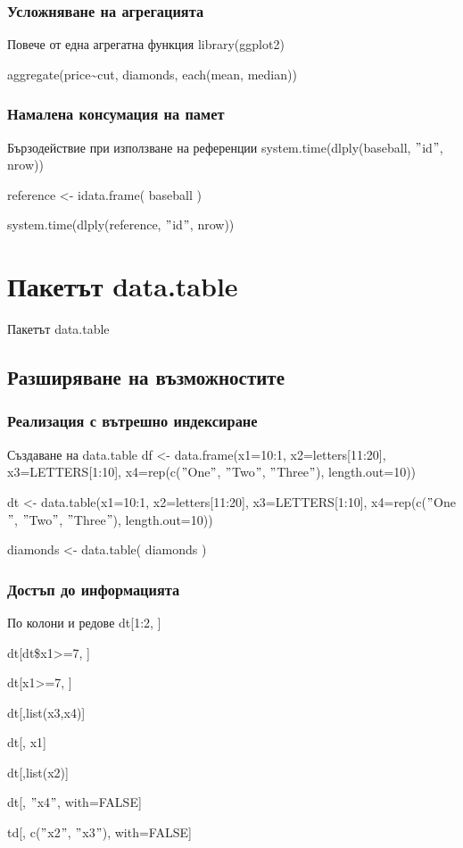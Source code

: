 \documentclass{beamer}
\begin{document}
\begin{frame}
\frametitle{Усложняване на агрегацията}
\begin{block}{Повече от една агрегатна функция}
library(ggplot2)

aggregate(price\textasciitilde cut, diamonds, each(mean, median))
\end{block}
\end{frame}

\begin{frame}
\frametitle{Намалена консумация на памет}
\begin{block}{Бързодействие при използване на референции}
system.time(dlply(baseball, $"$id$"$, nrow))

reference <- idata.frame( baseball )

system.time(dlply(reference, $"$id$"$, nrow))
\end{block}
\end{frame}

\section{Пакетът data.table}

\begin{frame}
\center \huge{Пакетът data.table}
\end{frame}

\subsection{Разширяване на възможностите}

\begin{frame}
\frametitle{Реализация с вътрешно индексиране}
\begin{block}{Създаване на data.table}
df <- data.frame(x1=10:1, x2=letters[11:20], x3=LETTERS[1:10], x4=rep(c($"$One$"$, $"$Two$"$, $"$Three$"$), length.out=10))

dt <- data.table(x1=10:1, x2=letters[11:20], x3=LETTERS[1:10], x4=rep(c($"$One$"$, $"$Two$"$, $"$Three$"$), length.out=10))

diamonds <- data.table( diamonds )
\end{block}
\end{frame}

\begin{frame}
\frametitle{Достъп до информацията}
\begin{block}{По колони и редове}
dt[1:2, ]

dt[dt\$x1>=7, ]

dt[x1>=7, ]

dt[,list(x3,x4)]

dt[, x1]

dt[,list(x2)]

dt[, $"$x4$"$, with=FALSE]


td[, c($"$x2$"$, $"$x3$"$), with=FALSE]
\end{block}
\end{frame}
\end{document}
